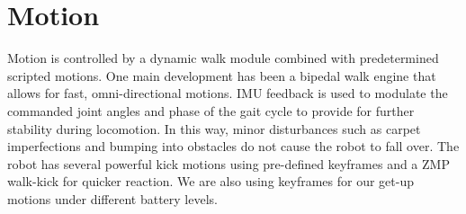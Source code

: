 \documentclass{article}
\begin{document}

\section{Motion}
	Motion is controlled by a dynamic walk module combined with predetermined scripted motions. One main development has been a bipedal walk engine that allows for fast, omni-directional motions. IMU feedback is used to modulate the commanded joint angles and phase of the gait cycle to provide for further stability during locomotion. In this way, minor disturbances such as carpet imperfections and bumping into obstacles do not cause the robot to fall over. The robot has several powerful kick motions using pre-defined keyframes and a ZMP walk-kick for quicker reaction. We are also using keyframes for our get-up motions under different battery levels.
\end{document}
